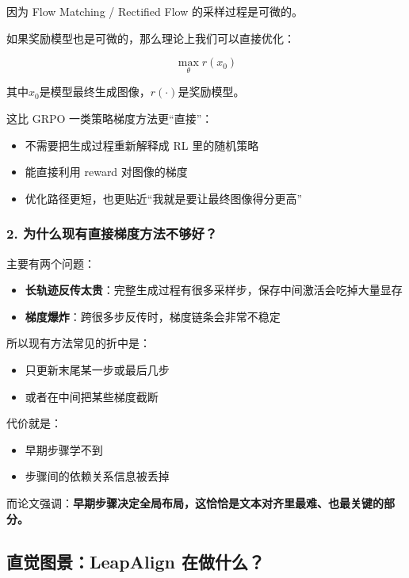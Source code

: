 因为 Flow Matching / Rectified Flow 的采样过程是可微的。

如果奖励模型也是可微的，那么理论上我们可以直接优化：

\[
\max_\theta r(x_0)
\]

其中$x_0$是模型最终生成图像，$r(\cdot)$是奖励模型。

这比 GRPO 一类策略梯度方法更“直接”：

\begin{itemize}[leftmargin=1.5em]
  \item 不需要把生成过程重新解释成 RL 里的随机策略
  \item 能直接利用 reward 对图像的梯度
  \item 优化路径更短，也更贴近“我就是要让最终图像得分更高”
\end{itemize}

\subsubsection{2. 为什么现有直接梯度方法不够好？}

主要有两个问题：

\begin{itemize}[leftmargin=1.5em]
  \item \textbf{长轨迹反传太贵}：完整生成过程有很多采样步，保存中间激活会吃掉大量显存
  \item \textbf{梯度爆炸}：跨很多步反传时，梯度链条会非常不稳定
\end{itemize}

所以现有方法常见的折中是：

\begin{itemize}[leftmargin=1.5em]
  \item 只更新末尾某一步或最后几步
  \item 或者在中间把某些梯度截断
\end{itemize}

代价就是：

\begin{itemize}[leftmargin=1.5em]
  \item 早期步骤学不到
  \item 步骤间的依赖关系信息被丢掉
\end{itemize}

而论文强调：\textbf{早期步骤决定全局布局，这恰恰是文本对齐里最难、也最关键的部分。}

\subsection{直觉图景：LeapAlign 在做什么？}

